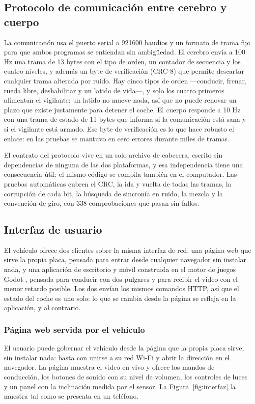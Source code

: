 \documentclass[journal]{IEEEtran}
\begin{document}
\subsection{Protocolo de comunicación entre cerebro y cuerpo}
La comunicación usa el puerto serial a 921600 baudios y un formato de trama fijo para que ambos programas se entiendan sin ambigüedad. El cerebro envía a 100 Hz una trama de 13 bytes con el tipo de orden, un contador de secuencia y los cuatro niveles, y además un byte de verificación (CRC-8) que permite descartar cualquier trama alterada por ruido. Hay cinco tipos de orden ---conducir, frenar, rueda libre, deshabilitar y un latido de vida---, y solo los cuatro primeros alimentan el vigilante: un latido no mueve nada, así que no puede renovar un plazo que existe justamente para detener el coche. El cuerpo responde a 10 Hz con una trama de estado de 11 bytes que informa si la comunicación está sana y si el vigilante está armado. Ese byte de verificación es lo que hace robusto el enlace: en las pruebas se mantuvo en cero errores durante miles de tramas.

El contrato del protocolo vive en un solo archivo de cabecera, escrito sin dependencias de ninguna de las dos plataformas, y esa independencia tiene una consecuencia útil: el mismo código se compila también en el computador. Las pruebas automáticas cubren el CRC, la ida y vuelta de todas las tramas, la corrupción de cada bit, la búsqueda de sincronía en ruido, la mezcla y la convención de giro, con 338 comprobaciones que pasan sin fallos.

\subsection{Interfaz de usuario}
El vehículo ofrece dos clientes sobre la misma interfaz de red: una página web que sirve la propia placa, pensada para entrar desde cualquier navegador sin instalar nada, y una aplicación de escritorio y móvil construida en el motor de juegos Godot \cite{godot}, pensada para conducir con dos pulgares y para recibir el video con el menor retardo posible. Los dos envían los mismos comandos HTTP, así que el estado del coche es uno solo: lo que se cambia desde la página se refleja en la aplicación, y al contrario.

\subsubsection{Página web servida por el vehículo}
El usuario puede gobernar el vehículo desde la página que la propia placa sirve, sin instalar nada: basta con unirse a su red Wi-Fi y abrir la dirección en el navegador. La página muestra el video en vivo y ofrece los mandos de conducción, los botones de sonido con su nivel de volumen, los controles de luces y un panel con la inclinación medida por el sensor. La Figura~\ref{fig:interfaz} la muestra tal como se presenta en un teléfono.
\end{document}
